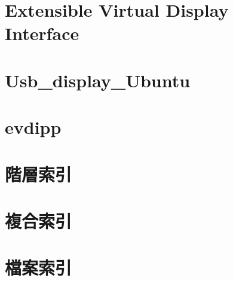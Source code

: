 \let\mypdfximage\pdfximage\def\pdfximage{\immediate\mypdfximage}\documentclass[twoside]{book}
\newcommand{\+}{\discretionary{\mbox{\scriptsize$\hookleftarrow$}}{}{}}
\begin{document}
\begin{CJK}{UTF8}{min}
\chapter{Extensible Virtual Display Interface}
\label{md__home_odin_Desktop_program_learn_usbdisp_linux_libusbdisp_deb_install_com_racertech_usbdisp_1bf0353262a8f609392125978c3ba1977}

\chapter{Usb\+\_\+display\+\_\+\+Ubuntu}
\label{md__home_odin_Desktop_program_learn_usbdisp_linux_libusbdisp_README}

\chapter{evdipp}
\label{md__home_odin_Desktop_program_learn_usbdisp_linux_README}

\chapter{階層索引}

\chapter{複合索引}

\chapter{檔案索引}


\end{CJK}
\end{document}
